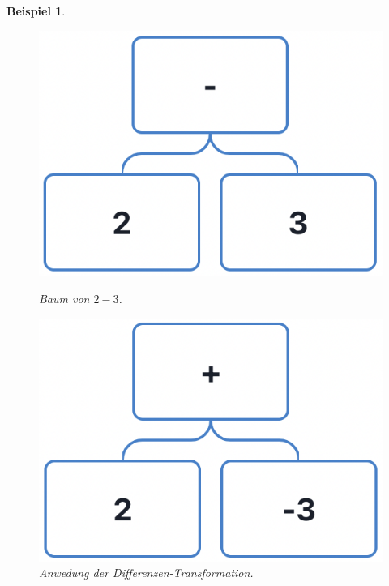 \documentclass[11pt]{article}
\newtheorem{example}{Beispiel}
\begin{document}
\begin{example} \normalfont
  \begin{figure}[h]
    \begin{minipage}{.5\textwidth}
      \centering
      \includegraphics[scale=0.4]{trees/difference/beispiel_1_1.png}
      \caption{Baum von $2-3$.}
    \end{minipage}
    \begin{minipage}{.5\textwidth}
      \centering
      \includegraphics[scale=0.4]{trees/difference/beispiel_1_2.png}
      \caption{Anwedung der Differenzen-Transformation.}
    \end{minipage}
  \end{figure}
  \begin{figure}[h]
    \centering

\end{figure}
\end{example}
\end{document}

